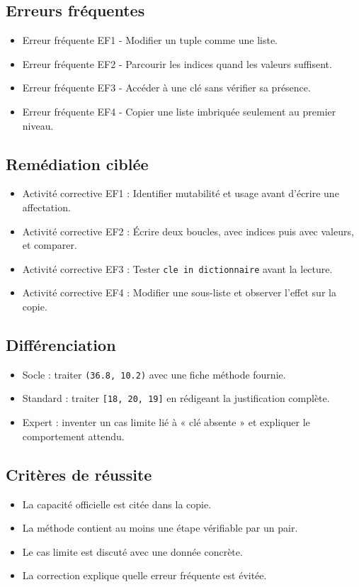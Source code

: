 \subsection{Erreurs fréquentes}

\begin{itemize}
\tightlist
\item
  Erreur fréquente EF1 - Modifier un tuple comme une liste.
\item
  Erreur fréquente EF2 - Parcourir les indices quand les valeurs
  suffisent.
\item
  Erreur fréquente EF3 - Accéder à une clé sans vérifier sa présence.
\item
  Erreur fréquente EF4 - Copier une liste imbriquée seulement au premier
  niveau.
\end{itemize}

\subsection{Remédiation ciblée}

\begin{itemize}
\tightlist
\item
  Activité corrective EF1 : Identifier mutabilité et usage avant
  d'écrire une affectation.
\item
  Activité corrective EF2 : Écrire deux boucles, avec indices puis avec
  valeurs, et comparer.
\item
  Activité corrective EF3 : Tester \texttt{cle\ in\ dictionnaire} avant
  la lecture.
\item
  Activité corrective EF4 : Modifier une sous-liste et observer l'effet
  sur la copie.
\end{itemize}

\subsection{Différenciation}

\begin{itemize}
\tightlist
\item
  Socle : traiter \texttt{(36.8,\ 10.2)} avec une fiche méthode fournie.
\item
  Standard : traiter \texttt{{[}18,\ 20,\ 19{]}} en rédigeant la
  justification complète.
\item
  Expert : inventer un cas limite lié à « clé absente » et expliquer le
  comportement attendu.
\end{itemize}

\subsection{Critères de réussite}

\begin{itemize}
\tightlist
\item
  La capacité officielle est citée dans la copie.
\item
  La méthode contient au moins une étape vérifiable par un pair.
\item
  Le cas limite est discuté avec une donnée concrète.
\item
  La correction explique quelle erreur fréquente est évitée.
\end{itemize}
